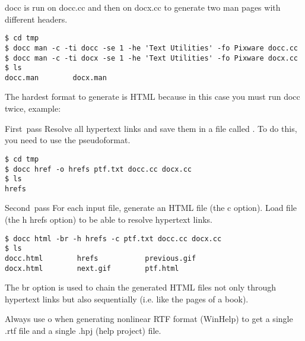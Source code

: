 
docc is run on docc.cc and then on docx.cc to generate two man pages with
different headers.

\begin{pverbatim}
\begin{verbatim}
$ cd tmp
$ docc man -c -ti docc -se 1 -he 'Text Utilities' -fo Pixware docc.cc
$ docc man -c -ti docx -se 1 -he 'Text Utilities' -fo Pixware docx.cc
$ ls
docc.man        docx.man
\end{verbatim}
\end{pverbatim}


The hardest format to generate is HTML because in this case you must run docc
twice, example:

\begin{pdefinitionlist}

\item[\mbox{First pass}] Resolve all hypertext links and save them in a file
called . To do this, you need to use the 
pseudoformat.

\begin{pverbatim}
\begin{verbatim}
$ cd tmp
$ docc href -o hrefs ptf.txt docc.cc docx.cc
$ ls
hrefs
\end{verbatim}
\end{pverbatim}

\item[\mbox{Second pass}] For each input file, generate an HTML file (the
c option). Load file  (the h hrefs
option) to be able to resolve hypertext links.

\begin{pverbatim}
\begin{verbatim}
$ docc html -br -h hrefs -c ptf.txt docc.cc docx.cc
$ ls
docc.html        hrefs           previous.gif
docx.html        next.gif        ptf.html
\end{verbatim}
\end{pverbatim}

The br option is used to chain the generated HTML files not only
through hypertext links but also sequentially (i.e. like the pages of a book).

\end{pdefinitionlist}


Always use o when generating nonlinear RTF format
(WinHelp) to get a single .rtf file and a single .hpj (help project) file.

